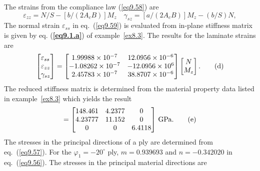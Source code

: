 \documentclass{AeroStructure-ERJohnson}
\begin{document}
\begin{example}
The strains from the compliance law (\ref{eq9.58}) are
\begin{equation}
\varepsilon_{z z}=N/S-\left[b /\left(2 A_{c} B\right)\right] M_{z} \quad \gamma_{s z}=\left[a /\left(2 A_{c} B\right)\right] M_{z}-(b/S) N, \label{eq9.1.c}\tag{c}
\end{equation}
The normal strain $\varepsilon_{ss}$ in eq.~(\ref{eq9.59}) is evaluated from in-plane stiffness matrix is given by eq. (\textbf{\ref{eq9.1.a}}) of example~\ref{ex8.3}. The results for the laminate strains are
\begin{equation}
\left[\begin{array}{@{}l@{}}\varepsilon_{s s} \\\varepsilon_{z z} \\\gamma_{s z}\end{array}\right]=\left[\begin{array}{@{}cc@{}}1.99988 \times 10^{-7} & 12.0956 \times 10^{-6} \\-1.08262 \times 10^{-7} & -12.0956 \times 10^{6} \\2.45783 \times 10^{-7} & 38.8707 \times 10^{-6}\end{array}\right]\left[\begin{array}{@{}c@{}}N \\M_{z}\end{array}\right].\label{eq9.1.d}\tag{d}
\end{equation}
The reduced stiffness matrix is determined from the material property data listed in example~\ref{ex8.3} which yields the result
\begin{equation}
[Q]=\left[\begin{array}{@{}ccc@{}}148.461 & 4.2377 & 0 \\4.23777 & 11.152 & 0 \\0 & 0 & 6.4118\end{array}\right]\,\mathrm{GPa}. \label{eq9.1.e}\tag{e}
\end{equation}
The stresses in the principal directions of a ply are determined from eq.~(\ref{eq9.57}). For the $\varphi_{1}=-20^{\circ}$ ply, $m=0.939693$ and $n=-0.342020$ in eq.~(\ref{eq9.56}). The stresses in the principal material directions are
\begin{equation}

\end{equation}
\end{example}
\end{document}
